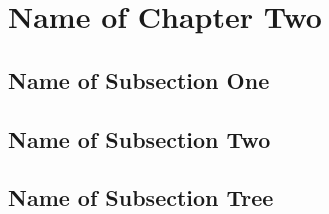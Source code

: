 \section{Name of Chapter Two}

\lipsum[4]

\subsection{Name of Subsection One}

\lipsum

\subsection{Name of Subsection Two}

\lipsum

\subsection{Name of Subsection Tree}

\lipsum
